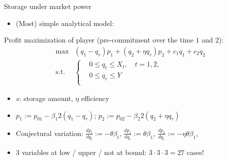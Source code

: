 \documentclass[aspectratio=169,t]{beamer}  %
\begin{document}
\begin{frame}{Storage under market power}

\begin{itemize}
\item 
(Most) simple analytical model: 
\end{itemize}
Profit maximization of player (pre-commitment over the time $1$ and $2$):
\begin{align*}
    \max & (q_1-q_r)p_1 + (q_2+\eta q_r) p_2 + c_1 q_1 + c_2 q_2\\
     \text{s.t.}&\left\{
     \begin{aligned}
     & 0\leq q_t \leq X_t,\quad t=1,2,\\
      & 0\leq q_r \leq Y\\
     \end{aligned}\right.
\end{align*}
\begin{itemize} 
  \item $s$: storage amount, $\eta$ efficiency
  \item $p_1 := p_{01} - \beta_1 2 (q_1-q_r)$; $p_2 := p_{02} - \beta_2 2 (q_2+\eta q_r)$
  \item  Conjectural variation: $\frac{dp_t}{dq_t} := -\theta \beta_t$,
      $\frac{dp_1}{dq_r} := \theta \beta_1$, $\frac{dp_2}{dq_r} := -\eta \theta \beta_1$,
    \item 3 variables at low / upper / not at bound: $3\cdot3\cdot3=27$ cases!
\end{itemize}  
\end{frame}
\end{document}
